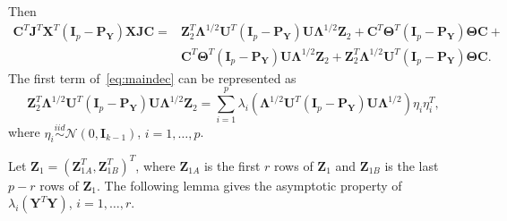 \documentclass[12pt]{article} %
\newcommand{\bZ}{\mathbf{Z}}
\newcommand{\bX}{\mathbf{X}}
\newcommand{\bP}{\mathbf{P}}
\newcommand{\bY}{\mathbf{Y}}
\newcommand{\bJ}{\mathbf{J}}
\newcommand{\bC}{\mathbf{C}}
\newcommand{\bI}{\mathbf{I}}
\newcommand{\bU}{\mathbf{U}}
\newcommand{\bfsym}[1]{\ensuremath{\boldsymbol{#1}}}
\def\bLambda {\bfsym {\Lambda}}
\def\bTheta {\bfsym {\Theta}}
\theoremstyle{definition}
\begin{document}
\begin{appendices}
Then 
\begin{equation}\label{eq:maindec}
\begin{aligned}
\bC^T\bJ^T \bX^T(\bI_p-\bP_{\bY}) \bX\bJ\bC
=&
\bZ_2^T \bLambda^{1/2}\bU^T (\bI_p-\bP_{\bY})\bU\bLambda^{1/2}\bZ_2+
 \bC^T \bTheta^T (\bI_p -\bP_{\bY})\bTheta \bC+\\
& \bC^T \bTheta^T (\bI_p -\bP_{\bY})\bU\bLambda^{1/2}\bZ_2+
\bZ_2^T \bLambda^{1/2}\bU^T (\bI_p-\bP_{\bY})\bTheta \bC.
\end{aligned}
\end{equation}
    The first term of~\eqref{eq:maindec} can be represented as
\begin{equation}\label{eq:firstTerm}
\bZ_2^T \bLambda^{1/2}\bU^T (\bI_p-\bP_{\bY})\bU\bLambda^{1/2}\bZ_2=
\sum_{i=1}^p \lambda_i (\bLambda^{1/2}\bU^T (\bI_p-\bP_{\bY})\bU\bLambda^{1/2})\eta_i \eta_i^T,
\end{equation}
where $\eta_i\overset{iid}{\sim} \mathcal{N}(0,\bI_{k-1})$, $i=1,\ldots,p$.




Let $\bZ_1=(\bZ_{1A}^T,\bZ_{1B}^T)^T$, where $\bZ_{1A}$ is the first $r$ rows of $\bZ_1$ and $\bZ_{1B}$ is the last $p-r$ rows of $\bZ_1$.
The following lemma gives the asymptotic property of $\lambda_{i}(\bY^T \bY)$, $i=1,\ldots, r$.



\end{appendices}
\end{document}
